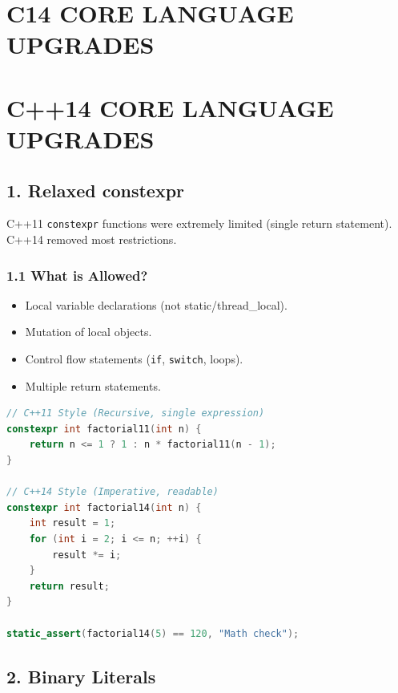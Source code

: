 \hypertarget{c14-core-language-upgrades}{%
\chapter{C14 CORE LANGUAGE UPGRADES}\label{c14-core-language-upgrades}}

\hypertarget{c14-core-language-upgrades-1}{%
\chapter{C++14 CORE LANGUAGE
UPGRADES}\label{c14-core-language-upgrades-1}}

\hypertarget{relaxed-constexpr}{%
\section{1. Relaxed constexpr}\label{relaxed-constexpr}}

C++11 \passthrough{\lstinline!constexpr!} functions were extremely
limited (single return statement). C++14 removed most restrictions.

\hypertarget{what-is-allowed}{%
\subsection{1.1 What is Allowed?}\label{what-is-allowed}}

\begin{itemize}
\tightlist
\item
  Local variable declarations (not static/thread\_local).
\item
  Mutation of local objects.
\item
  Control flow statements (\passthrough{\lstinline!if!},
  \passthrough{\lstinline!switch!}, loops).
\item
  Multiple return statements.
\end{itemize}

\begin{lstlisting}[language={C++}]
// C++11 Style (Recursive, single expression)
constexpr int factorial11(int n) {
    return n <= 1 ? 1 : n * factorial11(n - 1);
}

// C++14 Style (Imperative, readable)
constexpr int factorial14(int n) {
    int result = 1;
    for (int i = 2; i <= n; ++i) {
        result *= i;
    }
    return result;
}

static_assert(factorial14(5) == 120, "Math check");
\end{lstlisting}

\hypertarget{binary-literals}{%
\section{2. Binary Literals}\label{binary-literals}}

